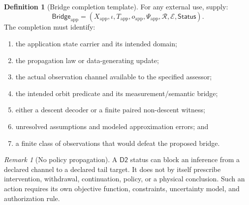 \documentclass[11pt]{article}
\newcommand{\DTwo}{\ensuremath{\mathsf{D2}}}
\newcommand{\Status}{\ensuremath{\mathsf{Status}}}
\theoremstyle{plain}
\theoremstyle{definition}
\newtheorem{definition}[theorem]{Definition}
\theoremstyle{remark}
\newtheorem{remark}[theorem]{Remark}
\begin{document}
\begin{definition}[Bridge completion template]
For any external use, supply:
\[
\mathsf{Bridge}_{\mathrm{app}}=
(X_{\mathrm{app}},\iota,T_{\mathrm{app}},o_{\mathrm{app}},
\Psi_{\mathrm{app}},\mathcal R,\mathcal E,\Status).
\]
The completion must identify:
\begin{enumerate}[label=\textnormal{(B\arabic*)},leftmargin=2.6em]
\item the application state carrier and its intended domain;
\item the propagation law or data-generating update;
\item the actual observation channel available to the specified assessor;
\item the intended orbit predicate and its measurement/semantic bridge;
\item either a descent decoder or a finite paired non-descent witness;
\item unresolved assumptions and modeled approximation errors; and
\item a finite class of observations that would defeat the proposed bridge.
\end{enumerate}
\end{definition}

\begin{remark}[No policy propagation]
A $\DTwo$ status can block an inference from a declared channel to a declared
tail target.  It does not by itself prescribe intervention, withdrawal,
continuation, policy, or a physical conclusion.  Such an action requires its own
objective function, constraints, uncertainty model, and authorization rule.
\end{remark}
\end{document}

